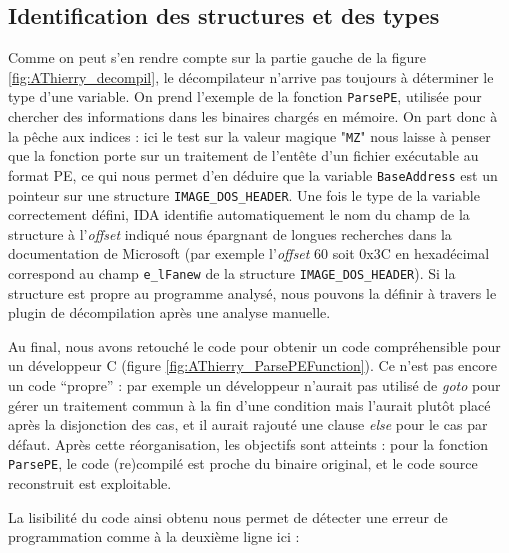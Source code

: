 \subsection{Identification des structures et des types}
Comme on peut s'en rendre compte sur la partie gauche de la figure \ref{fig:AThierry_decompil}, le décompilateur n'arrive pas toujours à déterminer le type d'une variable.
On prend l'exemple de la fonction \texttt{ParsePE}, utilisée pour chercher des informations dans les binaires chargés en mémoire.
On part donc à la pêche aux indices : ici le test sur la valeur magique "\texttt{MZ}" nous laisse à penser que la fonction porte sur un traitement de l'entête d'un fichier exécutable au format PE, ce qui nous permet d'en déduire que la variable \texttt{BaseAddress} est un pointeur sur une structure \texttt{IMAGE\_DOS\_HEADER}. Une fois le type de la variable correctement défini, IDA identifie automatiquement le nom du champ de la structure à l'{\em offset} indiqué nous épargnant de longues recherches dans la documentation de Microsoft (par exemple l'{\em offset} 60 soit 0x3C en hexadécimal correspond au champ \texttt{e\_lFanew} de la structure \texttt{IMAGE\_DOS\_HEADER}). Si la structure est propre au programme analysé, nous pouvons la définir à travers le plugin de décompilation après une analyse manuelle.


Au final, nous avons retouché le code pour obtenir un code compréhensible pour un développeur C (figure \ref{fig:AThierry_ParsePEFunction}).
Ce n'est pas encore un code ``propre'' : par exemple un développeur n'aurait pas utilisé de \emph{goto} pour gérer un traitement commun à la fin d'une condition mais l'aurait plutôt placé après la disjonction des cas, et il aurait rajouté une clause \emph{else} pour le cas par défaut. Après cette réorganisation, les objectifs sont atteints : pour la fonction \texttt{ParsePE}, le code (re)compilé est proche du binaire original, et le code source reconstruit est exploitable.

La lisibilité du code ainsi obtenu nous permet de détecter une erreur de programmation comme à la deuxième ligne ici :

